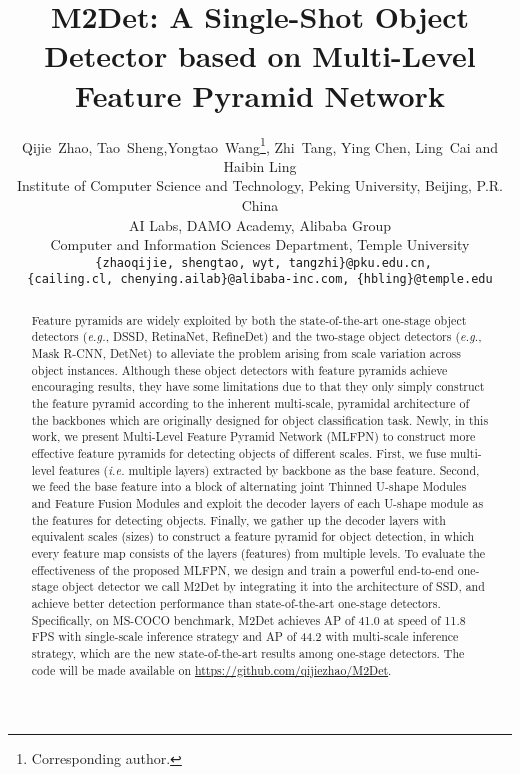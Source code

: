 \documentclass[letterpaper]{article} \usepackage{aaai18}  \usepackage{times}  \usepackage{helvet}  \usepackage{courier}  \usepackage{url}  \usepackage{graphicx}
\begin{document}
\title{M2Det: A Single-Shot Object Detector based on Multi-Level Feature Pyramid Network}

\author{Qijie~Zhao, Tao~Sheng,Yongtao~Wang\thanks{Corresponding author.}, Zhi~Tang,  Ying Chen, Ling~Cai and Haibin Ling
\\
\normalsize
Institute of Computer Science and Technology, Peking University, Beijing, P.R. China
\\
\normalsize
AI Labs, DAMO Academy, Alibaba Group
\\
\normalsize
Computer and Information Sciences Department, Temple University
\\
\tt\small
\{zhaoqijie, shengtao, wyt, tangzhi\}@pku.edu.cn,\\ 
\tt\small
\{cailing.cl, chenying.ailab\}@alibaba-inc.com, \{hbling\}@temple.edu
}

\maketitle
\begin{abstract}
Feature pyramids are widely exploited by both the state-of-the-art one-stage object detectors (\textit{e.g.}, DSSD, RetinaNet, RefineDet) and the two-stage object detectors (\textit{e.g.}, Mask R-CNN, DetNet) to alleviate the problem arising from scale variation across object instances. Although these object detectors with feature pyramids achieve encouraging results, they have some limitations due to that they only simply construct the feature pyramid according to the inherent multi-scale, pyramidal architecture of the backbones which are originally designed for object classification task. Newly, in this work, we present Multi-Level Feature Pyramid Network (MLFPN) to construct more effective feature pyramids for detecting objects of different scales. First, we fuse multi-level features (\textit{i.e.} multiple layers) extracted by backbone as the base feature. Second, we feed the base feature into a block of alternating joint Thinned U-shape Modules and Feature Fusion Modules and exploit the decoder layers of each U-shape module as the features for detecting objects. Finally, we gather up the decoder layers with equivalent scales (sizes) to construct a feature pyramid for object detection, in which every feature map consists of the layers (features) from multiple levels. To evaluate the effectiveness of the proposed MLFPN, we design and train a powerful end-to-end one-stage object detector we call M2Det by integrating it into the architecture of SSD, and achieve better detection performance than state-of-the-art one-stage detectors. Specifically, on MS-COCO benchmark, M2Det achieves AP of 41.0 at speed of 11.8 FPS with single-scale inference strategy and AP of 44.2 with multi-scale inference strategy, which are the new state-of-the-art results among one-stage detectors. The code will be made available on \url{https://github.com/qijiezhao/M2Det}.
\end{abstract}
\end{document}
